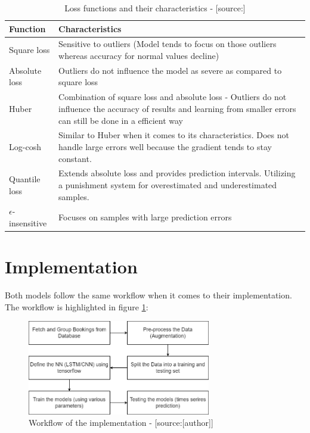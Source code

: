 \begin{table}[htbp]
	\centering
		\begin{tabularx}{\textwidth}{|l|X|}
		\hline
		\rowcolor[gray]{0.9}
		Function & Characteristics \\
		\hline
		Square loss &Sensitive to outliers (Model tends to focus on those outliers whereas accuracy for normal values decline)\\
		 \hline
		Absolute loss & Outliers do not influence the model as severe as compared to square loss  \\
		Huber & Combination of square loss and absolute loss - Outliers do not influence the accuracy of results and learning from smaller errors can still be done in a efficient way  \\
		\hline
		Log-cosh & Similar to Huber when it comes to its characteristics. Does not handle large errors well because the gradient tends to stay constant. \\
		\hline
		Quantile loss & Extends absolute loss and provides prediction intervals. Utilizing a punishment system for overestimated and underestimated samples. \\
		\hline
		$\epsilon$-insensitive & Focuses on samples with large prediction errors \\
		\hline	
		\end{tabularx}
	\caption{Loss functions and their characteristics - [source:\cite{loss_func}]}
	\label{tab:loss_function}
\end{table}

\section{Implementation}
Both models follow the same workflow when it comes to their implementation. The workflow is highlighted in figure \ref{fig:workflow}:

\begin{figure}[H]
	\centering
		\includegraphics[width=8cm]{images/workflow_imp}
	\caption{Workflow of the implementation - [source:[author]]}
	\label{fig:workflow}
\end{figure}


